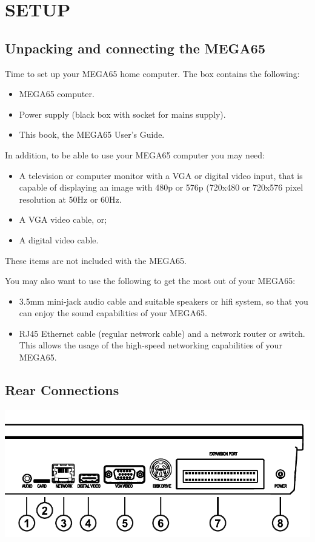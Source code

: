 \chapter{SETUP}
\section{Unpacking and connecting the MEGA65}

Time to set up your MEGA65 home computer.
The box contains the following:
\begin{itemize}
\setlength\itemsep{-0.75mm}
\item MEGA65 computer.
\item Power supply (black box with socket for mains supply).
\item This book, the MEGA65 User's Guide.
\end{itemize}

In addition, to be able to use your MEGA65 computer you may need:
\begin{itemize}
	\item A television or computer monitor with a VGA or digital video input, that is capable of displaying an image with 480p or 576p (720x480 or 720x576 pixel resolution at 50Hz or 60Hz.
\item A VGA video cable, or;
\item A digital video cable.
\end{itemize}

These items are not included with the MEGA65.

You may also want to use the following to get the most out of your MEGA65:
\begin{itemize}
\item 3.5mm mini-jack audio cable and suitable speakers or hifi system, so that you can enjoy the sound capabilities of your MEGA65.
\item RJ45 Ethernet cable (regular network cable) and a network router or switch. This allows the usage of the high-speed networking capabilities of your MEGA65.
\end{itemize}

\section{Rear Connections}

\includegraphics[width=\linewidth]{images/illustrations/mega65-rear.pdf}

